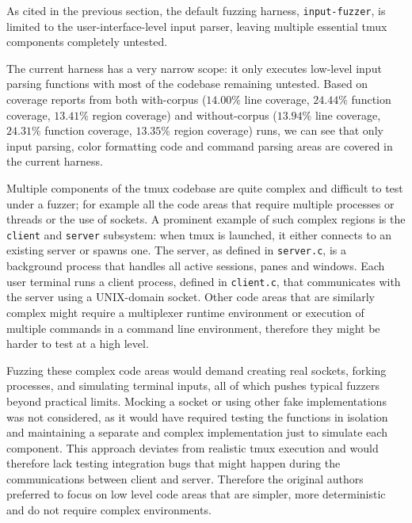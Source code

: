 As cited in the previous section, the default fuzzing harness, \texttt{input-fuzzer}, is limited to the user-interface-level input parser, leaving multiple essential tmux components completely untested.

The current harness has a very narrow scope: it only executes low-level input parsing functions with most of the codebase remaining untested. Based on coverage reports from both with-corpus ($14.00\%$ line coverage, $24.44\%$ function coverage, $13.41\%$ region coverage) and without-corpus ($13.94\%$ line coverage, $24.31\%$ function coverage, $13.35\%$ region coverage) runs, we can see that only input parsing, color formatting code and command parsing areas are covered in the current harness.

Multiple components of the tmux codebase are quite complex and difficult to test under a fuzzer; for example all the code areas that require multiple processes or threads or the use of sockets. A prominent example of such complex regions is the \texttt{client} and \texttt{server} subsystem: when tmux is launched, it either connects to an existing server or spawns one. The server, as defined in \texttt{server.c}, is a background process that handles all active sessions, panes and windows. Each user terminal runs a client process, defined in \texttt{client.c}, that communicates with the server using a UNIX-domain socket. Other code areas that are similarly complex might require a multiplexer runtime environment or execution of multiple commands in a command line environment, therefore they might be harder to test at a high level.

Fuzzing these complex code areas would demand creating real sockets, forking processes, and simulating terminal inputs, all of which pushes typical fuzzers beyond practical limits. Mocking a socket or using other fake implementations was not considered, as it would have required testing the functions in isolation and maintaining a separate and complex implementation just to simulate each component. This approach deviates from realistic tmux execution and would therefore lack testing integration bugs that might happen during the communications between client and server. Therefore the original authors preferred to focus on low level code areas that are simpler, more deterministic and do not require complex environments.

